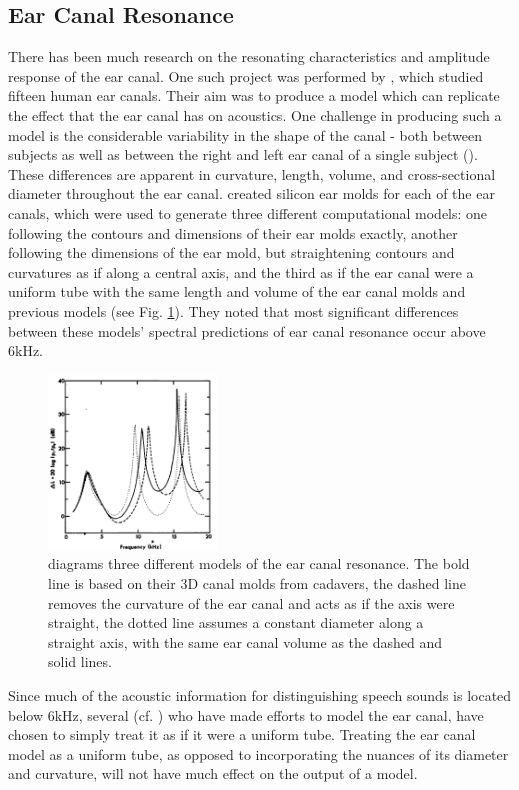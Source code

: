 \documentclass[dissertation,copyright]{uathesis}
\begin{document}
\subsection{Ear Canal Resonance}
There has been much research on the resonating characteristics and amplitude response of the ear canal.  One such project was performed by \cite{stinson:89}, which studied fifteen human ear canals.  Their aim was to produce a model which can replicate the effect that the ear canal has on acoustics.
One challenge in producing such a model is the considerable variability in the shape of the canal - both between subjects as well as between the right and left ear canal of a single subject (\cite{stinson:89}).  These differences are apparent in curvature, length, volume, and cross-sectional diameter throughout the ear canal.  \cite{stinson:89} created silicon ear molds for each of the ear canals, which were used to generate three different computational models: one following the contours and dimensions of their ear molds exactly, another following the dimensions of the ear mold, but straightening contours and curvatures as if along a central axis, and the third as if the ear canal were a uniform tube with the same length and volume of the ear canal molds and previous models (see Fig. \ref{fig:eac_modelling}).  They noted that most significant differences between these models' spectral predictions of ear canal resonance occur above 6kHz.  
%
\begin{figure}
\centering
  \includegraphics[width=0.4\textwidth]{figure/eac_mod_diffs.png}
  \caption{\cite{stinson:89} diagrams three different models of the ear canal resonance.  The bold line is based on their 3D canal molds from cadavers, the dashed line removes the curvature of the ear canal and acts as if the axis were straight, the dotted line assumes a constant diameter along a straight axis, with the same ear canal volume as the dashed and solid lines.}
  \label{fig:eac_modelling}
\end{figure}
%
Since much of the acoustic information for distinguishing speech sounds is located below 6kHz, several (cf. \cite{stinson:89,hansen:97b,stenfelt:07}) who have made efforts to model the ear canal, have chosen to simply treat it as if it were a uniform tube.  Treating the ear canal model as a uniform tube, as opposed to incorporating the nuances of its diameter and curvature, will not have much effect on the output of a model.
\end{document}
